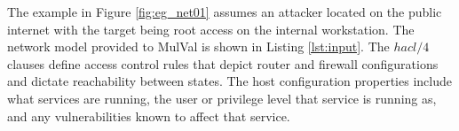 
The example in Figure \ref{fig:eg_net01} assumes an attacker located on the public internet with the target being root access on the internal workstation. The network model provided to MulVal is shown in Listing \ref{lst:input}. The $hacl/4$ clauses define access control rules that depict router and firewall configurations and dictate reachability between states. The host configuration properties include what services are running, the user or privilege level that service is running as, and any vulnerabilities known to affect that service.

